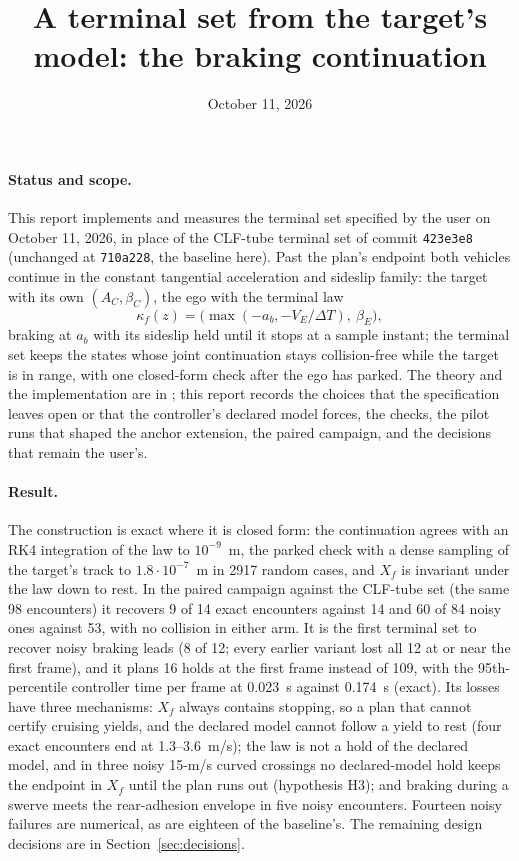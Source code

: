 \documentclass[11pt]{article}
\title{A terminal set from the target's model: the braking continuation}
\author{}
\date{October 11, 2026}
\begin{document}
\maketitle

\paragraph{Status and scope.}
This report implements and measures the terminal set specified by the user
on October 11, 2026, in place of the CLF-tube terminal set of commit
\texttt{423e3e8} (unchanged at \texttt{710a228}, the baseline here). Past the
plan's endpoint both vehicles continue in the constant tangential
acceleration and sideslip family: the target with its own $(A_C,\beta_C)$,
the ego with the terminal law
\[
\kappa_f(z)=\bigl(\max(-a_b,-V_E/\Delta T),\ \beta_E\bigr),
\]
braking at $a_b$ with its sideslip held until it stops at a sample instant;
the terminal set keeps the states whose joint continuation stays
collision-free while the target is in range, with one closed-form check
after the ego has parked. The theory and the implementation are in
; this report records the choices that
the specification leaves open or that the controller's declared model
forces, the checks, the pilot runs that shaped the anchor extension, the
paired campaign, and the decisions that remain the user's.

\paragraph{Result.}
The construction is exact where it is closed form: the continuation agrees
with an RK4 integration of the law to $10^{-9}$~m, the parked check with a
dense sampling of the target's track to $1.8\cdot10^{-7}$~m in 2917 random
cases, and $X_f$ is invariant under the law down to rest. In the paired
campaign against the CLF-tube set (the same 98 encounters) it recovers 9 of
14 exact encounters against 14 and 60 of 84 noisy ones against 53, with no
collision in either arm. It is the first terminal set to recover noisy
braking leads (8 of 12; every earlier variant lost all 12 at or near the
first frame), and it plans 16 holds at the first frame instead of 109, with
the 95th-percentile controller time per frame at 0.023~s against 0.174~s
(exact). Its losses have three mechanisms: $X_f$ always contains stopping, so
a plan that cannot certify cruising yields, and the declared model cannot
follow a yield to rest (four exact encounters end at 1.3--3.6~m/s); the law
is not a hold of the declared model, and in three noisy 15-m/s curved
crossings no declared-model hold keeps the endpoint in $X_f$ until the plan
runs out (hypothesis H3); and braking during a swerve meets the rear-adhesion
envelope in five noisy encounters. Fourteen noisy failures are numerical, as
are eighteen of the baseline's. The remaining design decisions are in
Section~\ref{sec:decisions}.
\end{document}

